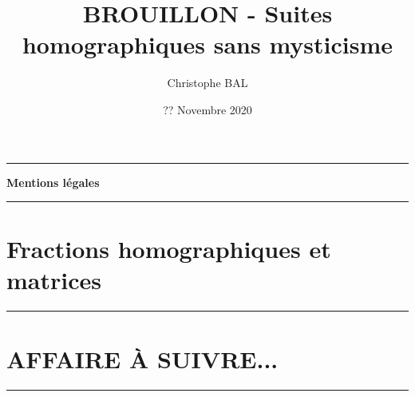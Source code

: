 \documentclass[12pt]{amsart}
\begin{document}
\title{BROUILLON - Suites homographiques sans mysticisme}
\author{Christophe BAL}
\date{?? Novembre 2020}
\maketitle


\vspace{-.9em}


\begin{center}
	\hrule\vspace{.3em}
	{
		\fontsize{1.35em}{1em}\selectfont
		\textbf{Mentions \og légales \fg}
	}
			
	\vspace{0.45em}
	\doclicenseThis
	\hrule
\end{center}



\setcounter{tocdepth}{2}
\tableofcontents




\section{Fractions homographiques et matrices}

	


%
%	
%
%


%
%	


\bigskip

\hrule

\section{AFFAIRE À SUIVRE...}

\bigskip

\hrule
\end{document}
